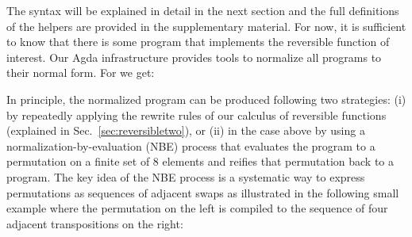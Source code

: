 
\resettwo{}

\noindent The syntax will be explained in detail in the next section and the full definitions of the helpers are provided in the
supplementary material. For now, it is sufficient to know that there is some program that implements the reversible
function of interest. Our Agda infrastructure provides tools to normalize all programs to their normal form. For
 we get:

\resetnormtwo{}

In principle, the normalized program can be produced following two strategies: (i) by repeatedly applying the rewrite
rules of our calculus of reversible functions (explained in Sec.~\ref{sec:reversibletwo}), or (ii) in the case above by
using a normalization-by-evaluation (NBE) process that evaluates the program to a permutation on a finite set of 8
elements and reifies that permutation back to a program. The key idea of the NBE process is a systematic way to express
permutations as sequences of adjacent swaps as illustrated in the following small example where the permutation on the
left is compiled to the sequence of four adjacent transpositions on the right:




